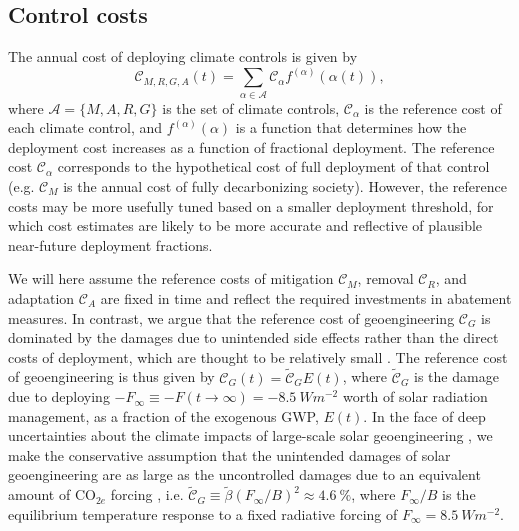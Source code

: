 \documentclass{article}
\begin{document}
\subsection{Control costs}

The annual cost of deploying climate controls is given by
\begin{equation}
    \mathcal{C}_{M, R, G, A}(t) = \sum_{\alpha \in \mathcal{A}} \mathcal{C}_{\alpha} f^{(\alpha)}(\alpha(t)),
\end{equation}
where $\mathcal{A} = \{M, A, R, G \}$ is the set of climate controls, $\mathcal{C}_{\alpha}$ is the reference cost of each climate control, and $f^{(\alpha)}(\alpha)$ is a function that determines how the deployment cost increases as a function of fractional deployment. The reference cost $\mathcal{C}_{\alpha}$ corresponds to the hypothetical cost of full deployment of that control (e.g. $\mathcal{C}_{M}$ is the annual cost of fully decarbonizing society). However, the reference costs may be more usefully tuned based on a smaller deployment threshold, for which cost estimates are likely to be more accurate and reflective of plausible near-future deployment fractions.

We will here assume the reference costs of mitigation $\mathcal{C}_{M}$, removal $\mathcal{C}_{R}$, and adaptation $\mathcal{C}_{A}$ are fixed in time and reflect the required investments in abatement measures. In contrast, we argue that the reference cost of geoengineering $\mathcal{C}_{G}$ is dominated by the damages due to unintended side effects rather than the direct costs of deployment, which are thought to be relatively small \citep{mcclellan_cost_2012}. The reference cost of geoengineering is thus given by $\mathcal{C}_{G}(t) = \tilde{\mathcal{C}}_{G} E(t)$, where $\tilde{\mathcal{C}}_{G}$ is the damage due to deploying $-F_{\infty} \equiv -F(t \rightarrow \infty) = \SI{-8.5}{W m^{-2}}$ worth of solar radiation management, as a fraction of the exogenous GWP, $E(t)$. In the face of deep uncertainties about the climate impacts of large-scale solar geoengineering \citep{irvine_towards_2017}, we make the conservative assumption that the unintended damages of solar geoengineering are as large as the uncontrolled damages due to an equivalent amount of CO$_{2e}$ forcing \citep[as in][]{goes_economics_2011, belaia_optimal_2019}, i.e. $\tilde{\mathcal{C}}_{G} \equiv \tilde{\beta} (F_{\infty}/B)^{2} \approx \SI{4.6}{\%}$, where $F_{\infty}/B$ is the equilibrium temperature response to a fixed radiative forcing of $F_{\infty} = \SI{8.5}{W m^{-2}}$.
\end{document}
